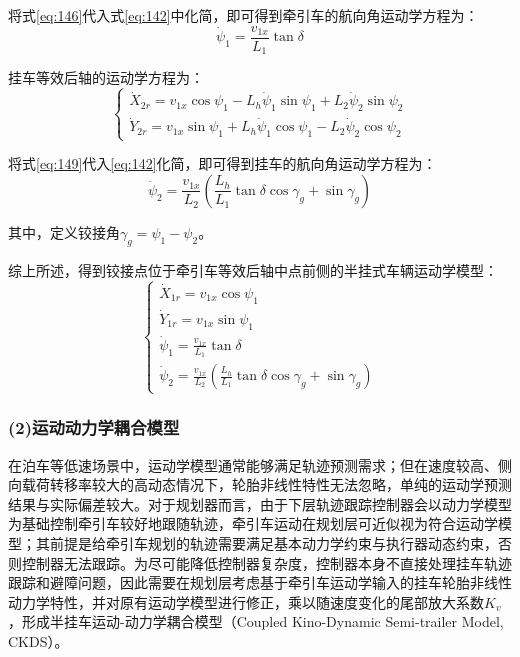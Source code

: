       将式\eqref{eq:146}代入式\eqref{eq:142}中化简，即可得到牵引车的航向角运动学方程为：
      \begin{equation}
      \dot{\psi}_1 = \frac{v_{1x}}{L_1}\tan\delta
      \label{eq:148}
      \end{equation}

      挂车等效后轴的运动学方程为：
      \begin{equation}
      \begin{cases}
      \dot{X}_{2r} = v_{1x} \cos\psi_1 - L_h\dot{\psi}_1 \sin\psi_1 + L_2\dot{\psi}_2 \sin\psi_2 \\
      \dot{Y}_{2r} = v_{1x} \sin\psi_1 + L_h\dot{\psi}_1 \cos\psi_1 - L_2\dot{\psi}_2 \cos\psi_2
      \end{cases}
      \label{eq:149}
      \end{equation}

      将式\eqref{eq:149}代入\eqref{eq:142}化简，即可得到挂车的航向角运动学方程为：
      \begin{equation}
      \dot{\psi}_2 = \frac{v_{1x}}{L_2}\left( \frac{L_h}{L_1}\tan\delta \cos\gamma_{g} + \sin\gamma_{g} \right)
      \label{eq:150}
      \end{equation}

      \noindent 其中，定义铰接角$\gamma_{g} = \psi_1 - \psi_2$。

      综上所述，得到铰接点位于牵引车等效后轴中点前侧的半挂式车辆运动学模型：
      \begin{equation}
      \begin{cases}
      \dot{X}_{1r} = v_{1x} \cos\psi_1 \\
      \dot{Y}_{1r} = v_{1x} \sin\psi_1 \\
      \dot{\psi}_1 = \frac{v_{1x}}{L_1}\tan\delta \\
      \dot{\psi}_2 = \frac{v_{1x}}{L_2}\left( \frac{L_h}{L_1}\tan\delta \cos\gamma_{g} + \sin\gamma_{g} \right)
      \end{cases}
      \label{eq:151}
      \end{equation}

    \subsubsection*{(2)运动动力学耦合模型}
      在泊车等低速场景中，运动学模型通常能够满足轨迹预测需求；但在速度较高、侧向载荷转移率较大的高动态情况下，轮胎非线性特性无法忽略，单纯的运动学预测结果与实际偏差较大。对于规划器而言，由于下层轨迹跟踪控制器会以动力学模型为基础控制牵引车较好地跟随轨迹，牵引车运动在规划层可近似视为符合运动学模型；其前提是给牵引车规划的轨迹需要满足基本动力学约束与执行器动态约束，否则控制器无法跟踪。为尽可能降低控制器复杂度，控制器本身不直接处理挂车轨迹跟踪和避障问题，因此需要在规划层考虑基于牵引车运动学输入的挂车轮胎非线性动力学特性，并对原有运动学模型进行修正，乘以随速度变化的尾部放大系数$K_v$，形成半挂车运动-动力学耦合模型（Coupled Kino-Dynamic Semi-trailer Model, CKDS）。

